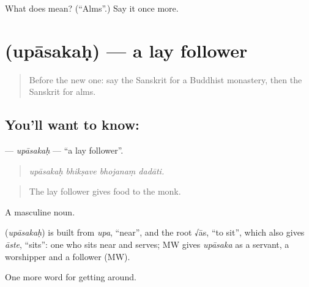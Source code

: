 \begin{tcolorbox}[breakable,colback=teal!4,colframe=teal!35!black,title={Before you move on}]
What does  mean? (\textquotedblleft{}Alms\textquotedblright{}.) Say it once more.
\end{tcolorbox}
\section[\texorpdfstring{\sk{उपासकः} (upāsakaḥ)}{उपासकः (upāsakaḥ)}]{ (upāsakaḥ) — a lay follower}

\label{lesson:SA-C401-upasakah}



\begin{quote}
Before the new one: say the Sanskrit for a Buddhist monastery, then the Sanskrit for alms.
\end{quote}

\subsection*{You'll want to know: }
\textbf{} — \emph{upāsakaḥ} — \textquotedblleft{}a lay follower\textquotedblright{}.

\begin{quote}
   
\end{quote}

\begin{quote}
\emph{upāsakaḥ bhikṣave bhojanaṃ dadāti.}
\end{quote}

\begin{quote}
The lay follower gives food to the monk.
\end{quote}

A masculine noun.

\begin{cousinweb}
\textbf{} (\emph{upāsakaḥ}) is built from \emph{upa}, \textquotedblleft{}near\textquotedblright{}, and the root √ās, \textquotedblleft{}to sit\textquotedblright{}, which also gives \emph{āste}, \textquotedblleft{}sits\textquotedblright{}: one who sits near and serves; MW gives \emph{upāsaka} as a servant, a worshipper and a follower (MW).
\end{cousinweb}

\begin{grammarlens}[title={What you've built}]
One more word for getting around.
\end{grammarlens}

